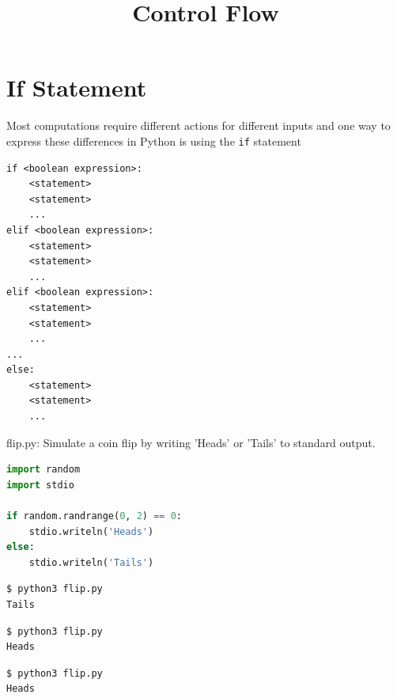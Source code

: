 \documentclass[8pt,a4paper,compress]{beamer}
\title{Control Flow}
\date{}
\begin{document}
\begin{frame}
\vfill
\titlepage
\end{frame}

\section{If Statement}
\begin{frame}[fragile]
\pause

Most computations require different actions for different inputs and one way to express these differences in Python is using the \lstinline{if} statement

\pause\bigskip

\begin{lstlisting}[language={},style=focusin]
if <boolean expression>:
    <statement>
    <statement>
    ...
elif <boolean expression>:
    <statement>
    <statement>
    ...
elif <boolean expression>:
    <statement>
    <statement>
    ...
...
else: 
    <statement>
    <statement>
    ...
\end{lstlisting}
\end{frame}

\begin{frame}[fragile]
\pause

\begin{framed}
\tiny flip.py: Simulate a coin flip by writing 'Heads' or 'Tails' to standard output.
\end{framed}

\begin{lstlisting}[language=Python,style=focusin]
import random
import stdio

if random.randrange(0, 2) == 0:
    stdio.writeln('Heads')
else:
    stdio.writeln('Tails')
\end{lstlisting}

\pause\bigskip

\begin{lstlisting}[language={},style=focusin]
$ python3 flip.py 
Tails
\end{lstlisting}

\pause\bigskip

\begin{lstlisting}[language={},style=focusin]
$ python3 flip.py 
Heads
\end{lstlisting}

\pause\bigskip

\begin{lstlisting}[language={},style=focusin]
$ python3 flip.py 
Heads
\end{lstlisting}
\end{frame}
\end{document}
